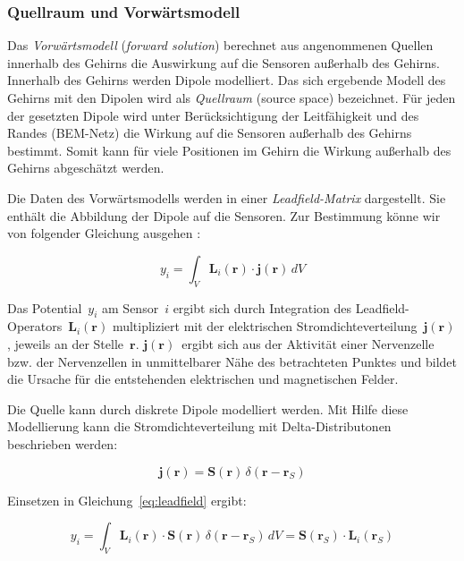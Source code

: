 \documentclass[doc,a4paper,12pt]{apa6}
\newcommand{\mx}[1]{\mathbf{#1}}
\begin{document}
\subsubsection{Quellraum und Vorwärtsmodell}
\label{sec:lead}

Das \emph{Vorwärtsmodell} (\emph{forward solution}) berechnet aus angenommenen Quellen innerhalb des Gehirns die Auswirkung auf die Sensoren außerhalb des Gehirns. Innerhalb des Gehirns werden Dipole modelliert. Das sich ergebende Modell des Gehirns mit den Dipolen wird als \emph{Quellraum} (source space) bezeichnet. Für jeden der gesetzten Dipole wird unter Berücksichtigung der Leitfähigkeit und des Randes (BEM-Netz) die Wirkung auf die Sensoren außerhalb des Gehirns bestimmt. Somit kann für viele Positionen im Gehirn die Wirkung außerhalb des Gehirns abgeschätzt werden.

Die Daten des Vorwärtsmodells werden in einer \emph{Leadfield-Matrix} dargestellt. Sie enthält die Abbildung der Dipole auf die Sensoren. Zur Bestimmung könne wir von folgender Gleichung ausgehen \parencite{maurits2011neurology}:

\begin{equation}
y_i = \int_V \mx{L}_i (\mx{r}) \cdot \mx{j} (\mx{r})\, dV
\label{eq:leadfield}
\end{equation}

Das Potential~$y_i$ am Sensor~$i$ ergibt sich durch Integration des Leadfield-Operators~$\mx{L}_i(\mx{r})$ multipliziert mit der elektrischen Stromdichteverteilung~$\mx{j}(\mx{r})$, jeweils an der Stelle~$\mx{r}$. $\mx{j}(\mx{r})$~ergibt sich aus der Aktivität einer Nervenzelle bzw. der Nervenzellen in unmittelbarer Nähe des betrachteten Punktes und bildet die Ursache für die entstehenden elektrischen und magnetischen Felder.

Die Quelle kann durch diskrete Dipole modelliert werden. Mit Hilfe diese Modellierung kann die Stromdichteverteilung mit Delta-Distributonen beschrieben werden:

\begin{equation}
\mx{j} (\mx{r}) = \mx{S}(\mx{r})\,\delta(\mx{r}-\mx{r}_S)
\end{equation}

Einsetzen in Gleichung~\ref{eq:leadfield} ergibt:

\begin{equation}
y_i = \int_V \mx{L}_i (\mx{r}) \cdot \mx{S}(\mx{r})\,\delta(\mx{r}-\mx{r}_S)\, dV = \mx{S}(\mx{r}_S) \cdot \mx{L}_i(\mx{r}_S)
\label{eq:leadfield2}
\end{equation}
\end{document}
